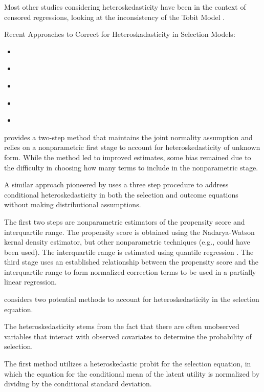 \documentclass{article}
\begin{document}
Most other studies considering heteroskedasticity have been in the context of censored regressions, looking at the inconsistency of the Tobit Model \citep{hurd1979, arabmazar1981, brown1983, brannas1989}.
\bigskip
\bigskip
\bigskip
\bigskip
\bigskip

Recent Approaches to Correct for Heteroskadasticity in Selection Models:
\begin{itemize}
    \item \citet{donald1995}
    \item \citet{schaffner2002}
    \item \citet{chen2003}
    \item \citet{adkins2004}
    \item \citet{reichert2014}
\end{itemize}


\citet{donald1995} provides a two-step method that maintains the joint normality assumption and relies on a nonparametric first stage to account for heteroskedasticity of unknown form. While the method led to improved estimates, some bias remained due to the difficulty in choosing how many terms to include in the nonparametric stage. 

A similar approach pioneered by \citet{chen2003} uses a three step procedure to address conditional heteroskedasticity in both the selection and outcome equations without making distributional assumptions.  

The first two steps are nonparametric estimators of the propensity score and interquartile range.  The propensity score is obtained using the Nadarya-Watson kernal density estimator, but other nonparametric techniques (e.g., \citet{klein1993} could have been used).  The interquartile range is estimated using quantile regression \citep{koenker1978}.  The third stage uses an established relationship between the propensity score and the interquartile range to form normalized correction terms to be used in a partially linear regression.

\citet{schaffner2002} considers two potential methods to account for heteroskedasticity in the selection equation. 

The heteroskedasticity stems from the fact that there are often unobserved variables that interact with observed covariates to determine the probability of selection.  

The first method utilizes a heteroskedastic probit for the selection equation, in which the equation for the conditional mean of the latent utility is normalized by dividing by the conditional standard deviation.  
\end{document}
